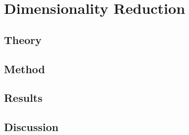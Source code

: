 \chapter{Dimensionality Reduction}
\section{Theory}

\section{Method}

\section{Results}

\section{Discussion}

